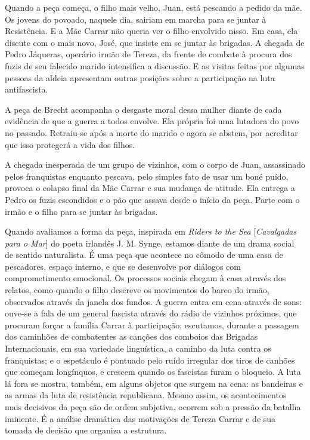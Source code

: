 Quando a peça começa, o filho mais velho, Juan, está pescando a pedido
da mãe. Os jovens do povoado, naquele dia, sairiam em marcha para se
juntar à Resistência. E a Mãe Carrar não queria ver o filho envolvido
nisso. Em casa, ela discute com o mais novo, José, que insiste em se
juntar às brigadas. A chegada de Pedro Jáqueras, operário irmão de
Tereza, da frente de combate à procura dos fuzis de seu falecido marido
intensifica a discussão. E as visitas feitas por algumas pessoas da
aldeia apresentam outras posições sobre a participação na luta
antifascista.

A peça de Brecht acompanha o desgaste moral dessa mulher diante de cada
evidência de que a guerra a todos envolve. Ela própria foi uma lutadora
do povo no passado. Retraiu-se após a morte do marido e agora se abstem,
por acreditar que isso protegerá a vida dos filhos.

A chegada inesperada de um grupo de vizinhos, com o corpo de Juan,
assassinado pelos franquistas enquanto pescava, pelo simples fato de
usar um boné puído, provoca o colapso final da Mãe Carrar e sua mudança
de atitude. Ela entrega a Pedro os fuzis escondidos e o pão que assava
desde o início da peça. Parte com o irmão e o filho para se juntar às
brigadas.

Quando avaliamos a forma da peça, inspirada em \textit{Riders to the Sea}
{[}\textit{Cavalgadas para o Mar}{]} do poeta irlandês J. M. Synge, estamos
diante de um drama social de sentido naturalista. É uma peça que
acontece no cômodo de uma casa de pescadores, espaço interno, e que se
desenvolve por diálogos com comprometimento emocional. Os processos
sociais chegam à casa através dos relatos, como quando o filho descreve
os movimentos do barco do irmão, observados através da janela dos
fundos. A guerra entra em cena através de sons: ouve-se a fala de um
general fascista através do rádio de vizinhos próximos, que procuram
forçar a família Carrar à participação; escutamos, durante a passagem
dos caminhões de combatentes as canções dos comboios das Brigadas
Internacionais, em sua variedade linguística, a caminho da luta contra
os franquistas; e o espetáculo é pontuado pelo ruído irregular dos tiros
de canhões que começam longínquos, e crescem quando os fascistas furam o
bloqueio. A luta lá fora se mostra, também, em alguns objetos que surgem
na cena: as bandeiras e as armas da luta de resistência republicana.
Mesmo assim, os acontecimentos mais decisivos da peça são de ordem
subjetiva, ocorrem sob a pressão da batalha iminente. É a análise
dramática das motivações de Tereza Carrar e de sua tomada de decisão que
organiza a estrutura.

